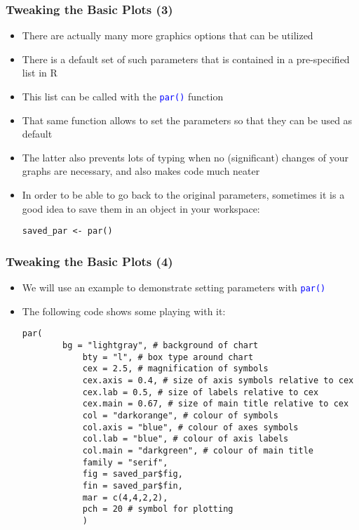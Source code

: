 \documentclass[10pt]{beamer}
\newcommand{\cc}[1]{\texttt{\textcolor{blue}{#1}}}
\theoremstyle{definition}
\begin{document}
\begin{frame}[fragile]
\frametitle{Tweaking the Basic Plots (3)}
\begin{itemize}
	\item There are actually many more graphics options that can be utilized
	\item There is a default set of such parameters that is contained in a pre-specified list in R
	\item This list can be called with the \cc{par()} function
	\item That same function allows to set the parameters so that they can be used as default
	\item The latter also prevents lots of typing when no (significant) changes of your graphs are necessary, and also makes code much neater
	\item In order to be able to go back to the original parameters, sometimes it is a good idea to save them in an object in your workspace:
	\begin{lstlisting}[style = rstyle, breaklines]
	saved_par <- par()
	\end{lstlisting}
\end{itemize}
\end{frame}

\begin{frame}[fragile]
\frametitle{Tweaking the Basic Plots (4)}
\begin{itemize}
	\item We will use an example to demonstrate setting parameters with \cc{par()}
	\item The following code shows some playing with it:
	\begin{lstlisting}[style = rstyle, breaklines]
	par(
  		bg = "lightgray", # background of chart
			bty = "l", # box type around chart
			cex = 2.5, # magnification of symbols
			cex.axis = 0.4, # size of axis symbols relative to cex
			cex.lab = 0.5, # size of labels relative to cex
			cex.main = 0.67, # size of main title relative to cex
			col = "darkorange", # colour of symbols
 			col.axis = "blue", # colour of axes symbols
			col.lab = "blue", # colour of axis labels
			col.main = "darkgreen", # colour of main title
			family = "serif",
			fig = saved_par$fig,
			fin = saved_par$fin,
			mar = c(4,4,2,2),
			pch = 20 # symbol for plotting
			)
	\end{lstlisting}
\end{itemize}
\end{frame}
\end{document}
